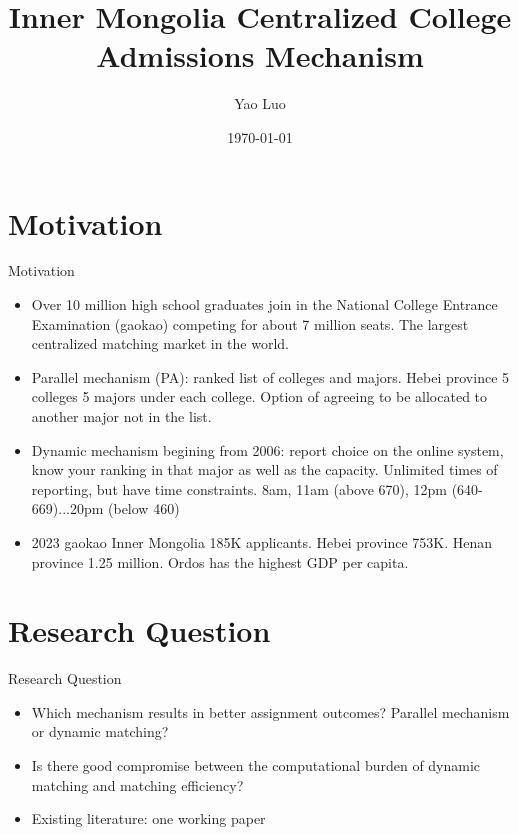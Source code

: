 \documentclass[dvipsnames,mathserif]{beamer}
\begin{document}
\rightskip\rightmargin
\title{Inner Mongolia Centralized College Admissions Mechanism}
\author{Yao Luo}


\footnotesize{\date{\today }


\begin{frame}
\maketitle
\end{frame}


%
\footnotesize \tableofcontents
%
\section{Motivation}
\begin{frame}{Motivation}
    \begin{itemize}
    \item Over 10 million high school graduates join in the National College Entrance Examination (gaokao) competing for about 7 million seats. The largest centralized matching market in the world.\\
    \item Parallel mechanism (PA): ranked list of colleges and majors. Hebei province 5 colleges 5 majors under each college. Option of agreeing to be allocated to another major not in the list.\\
    \item Dynamic mechanism begining from 2006: report choice on the online system, know your ranking in that major as well as the capacity. Unlimited times of reporting, but have time constraints. 8am, 11am (above 670), 12pm (640-669)...20pm (below 460)\\
    \item 2023 gaokao Inner Mongolia 185K applicants. Hebei province 753K. Henan province 1.25 million. Ordos has the highest GDP per capita.\\
    \end{itemize}  
\end{frame}


\section{Research Question}
\begin{frame}{Research Question}
    \begin{itemize}
        \item Which mechanism results in better assignment outcomes? Parallel mechanism or dynamic matching?\\
        \item Is there good compromise between the computational burden of dynamic matching and matching efficiency?\\
        \item Existing literature: one working paper 
    \end{itemize}
\end{frame}
}
\end{document}
